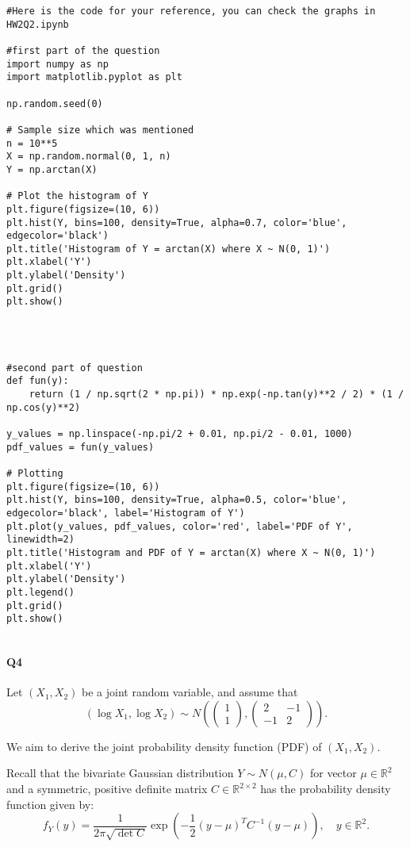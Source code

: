 \documentclass[10pt,letterpaper]{article}
\begin{document}
\lstset{language=Python}
\begin{lstlisting}
#Here is the code for your reference, you can check the graphs in HW2Q2.ipynb

#first part of the question 
import numpy as np
import matplotlib.pyplot as plt

np.random.seed(0)

# Sample size which was mentioned
n = 10**5
X = np.random.normal(0, 1, n)
Y = np.arctan(X)

# Plot the histogram of Y
plt.figure(figsize=(10, 6))
plt.hist(Y, bins=100, density=True, alpha=0.7, color='blue', edgecolor='black')
plt.title('Histogram of Y = arctan(X) where X ~ N(0, 1)')
plt.xlabel('Y')
plt.ylabel('Density')
plt.grid()
plt.show()




#second part of question
def fun(y):
    return (1 / np.sqrt(2 * np.pi)) * np.exp(-np.tan(y)**2 / 2) * (1 / np.cos(y)**2)

y_values = np.linspace(-np.pi/2 + 0.01, np.pi/2 - 0.01, 1000)
pdf_values = fun(y_values)

# Plotting
plt.figure(figsize=(10, 6))
plt.hist(Y, bins=100, density=True, alpha=0.5, color='blue', edgecolor='black', label='Histogram of Y')
plt.plot(y_values, pdf_values, color='red', label='PDF of Y', linewidth=2)
plt.title('Histogram and PDF of Y = arctan(X) where X ~ N(0, 1)')
plt.xlabel('Y')
plt.ylabel('Density')
plt.legend()
plt.grid()
plt.show()


\end{lstlisting}

\paragraph{Q4}
Let \((X_1, X_2)\) be a joint random variable, and assume that 
\[
(\log X_1, \log X_2) \sim N\left(\begin{pmatrix} 1 \\ 1 \end{pmatrix}, \begin{pmatrix} 2 & -1 \\ -1 & 2 \end{pmatrix}\right).
\]

We aim to derive the joint probability density function (PDF) of \((X_1, X_2)\).

Recall that the bivariate Gaussian distribution \(Y \sim N(\mu, C)\) for vector \(\mu \in \mathbb{R}^2\) and a symmetric, positive definite matrix \(C \in \mathbb{R}^{2 \times 2}\) has the probability density function given by:
\[
f_Y(y) = \frac{1}{2\pi \sqrt{\det C}} \exp\left(-\frac{1}{2} (y - \mu)^T C^{-1} (y - \mu)\right), \quad y \in \mathbb{R}^2.
\]
\end{document}
